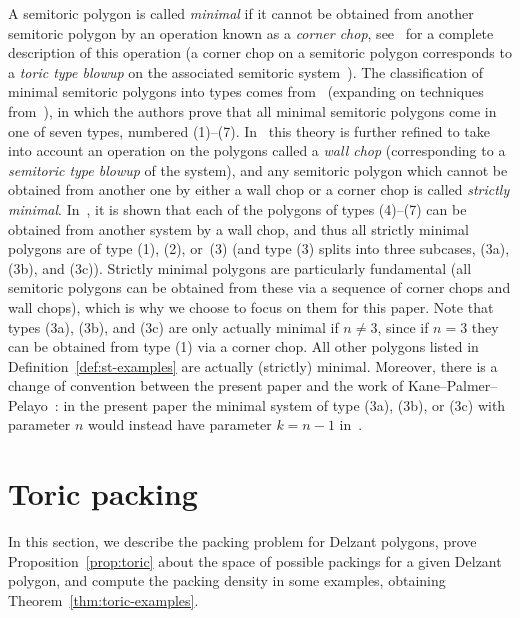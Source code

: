 \documentclass[10pt,a4paper]{amsart}
\numberwithin{equation}{section}
\theoremstyle{definition}
\theoremstyle{plain}
\theoremstyle{plain}
\begin{document}
\begin{Remark}\label{rmk:minimal}
 A semitoric polygon is called \emph{minimal} if it cannot be obtained from another semitoric polygon by an operation known as a \emph{corner chop}, see~\cite{KPP2018} for a complete description of this operation (a corner chop on a semitoric polygon corresponds to a \emph{toric type blowup} on the associated semitoric system~\cite[Section 4]{LFPal}).
 The classification of minimal semitoric polygons into types comes from~\cite{KPP2018} (expanding on techniques from~\cite{KPP2015}), in which the authors prove that all minimal semitoric polygons come in one of seven types, numbered (1)--(7).
 In~\cite{LFP-fam2} this theory is further refined to take into account an operation on the polygons called a \emph{wall chop} (corresponding to a \emph{semitoric type blowup} of the system), and any semitoric polygon which cannot be obtained from another one by either a wall chop or a corner chop is called \emph{strictly minimal}. In~\cite{LFP-fam2}, it is shown that each of the polygons of types (4)--(7) can be obtained from another system by a wall chop, and thus all strictly minimal polygons are of type (1), (2), or~(3) (and type (3) splits into three subcases, (3a), (3b), and (3c)).
 Strictly minimal polygons are particularly fundamental (all semitoric polygons can be obtained from these via a sequence of corner chops and wall chops), which is why we choose to focus on them for this paper.
 Note that types (3a), (3b), and (3c) are only actually minimal if $n\neq 3$, since if $n=3$ they can be obtained from type (1) via a corner chop. All other polygons listed in Definition~\ref{def:st-examples} are actually (strictly) minimal.
 Moreover, there is a change of convention between the present paper and the work of Kane--Palmer--Pelayo~\cite{KPP2018}: in the present paper the minimal system of type (3a), (3b), or (3c) with parameter $n$ would instead have parameter $k=n-1$ in~\cite{KPP2018}.
\end{Remark}

\section{Toric packing}\label{sec:toric}

In this section, we describe the packing problem for Delzant polygons, prove Proposition~\ref{prop:toric} about the space of possible packings for a given Delzant polygon, and compute the packing density in some examples, obtaining Theorem~\ref{thm:toric-examples}.
\end{document}
